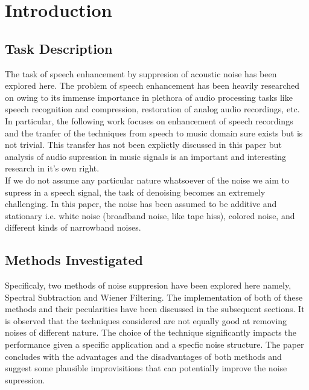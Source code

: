 \chapter{Introduction}

\section{Task Description}

The task of speech enhancement by suppresion of acoustic noise has been explored here. The problem of speech enhancement has been heavily researched on owing to its immense importance in plethora of audio processing tasks like speech recognition and compression, restoration of analog audio recordings, etc. In particular, the following work focuses on enhancement of speech recordings and the tranfer of the techniques from speech to music domain sure exists but is not trivial. This transfer has not been explictly discussed in this paper but analysis of audio supression in music signals is an important and interesting research in it's own right.  \\ 

If we do not assume any particular nature whatsoever of the noise we aim to supress in a speech signal, the task of denoising becomes an extremely challenging. In this paper, the noise has been assumed to be additive and stationary i.e. white noise (broadband noise, like tape hiss), colored noise, and different kinds of narrowband noises. \\ 

\section{Methods Investigated}
Specificaly, two methods of noise suppresion have been explored here namely, Spectral Subtraction and Wiener Filtering. The implementation of both of these methods and their pecularities have been discussed in the subsequent sections. It is observed that the techniques considered are not equally good at removing noises of different nature. The choice of the technique significantly impacts the performance given a specific application and a specfic noise structure. The paper concludes with the advantages and the disadvantages of both methods and suggest some plausible improvisitions that can potentially improve the noise supression.






